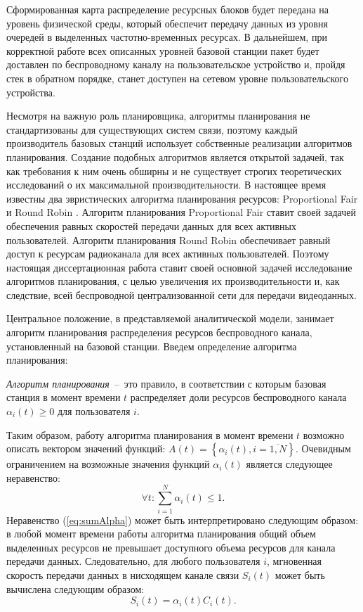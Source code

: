 Сформированная карта распределение ресурсных блоков будет передана на уровень физической среды, который обеспечит передачу данных из уровня очередей в выделенных частотно-временных ресурсах. В дальнейшем, при корректной работе всех описанных уровней базовой станции пакет будет доставлен по беспроводному каналу на пользовательское устройство и, пройдя стек в обратном порядке, станет доступен на сетевом уровне пользовательского устройства.

Несмотря на важную роль планировщика, алгоритмы планирования не стандартизованы для существующих систем связи, поэтому каждый производитель базовых станций использует собственные реализации алгоритмов планирования. Создание подобных алгоритмов является открытой задачей, так как требования к ним очень обширны и не существует строгих теоретических исследований о их максимальной производительности. В настоящее время известны два эвристических алгоритма планирования ресурсов: Proportional Fair \cite{1310314} и Round Robin \cite{miao_zander_sung_ben_slimane_2016}. Алгоритм планирования Proportional Fair ставит своей задачей обеспечения равных скоростей передачи данных для всех активных пользователей. Алгоритм планирования Round Robin обеспечивает равный доступ к ресурсам радиоканала для всех активных пользователей. Поэтому настоящая диссертационная работа ставит своей основной задачей исследование алгоритмов планирования, с целью увеличения их производительности и, как следствие, всей беспроводной централизованной сети для передачи видеоданных.

Центральное положение, в представляемой аналитической модели, занимает алгоритм планирования распределения ресурсов беспроводного канала, установленный на базовой станции. Введем определение алгоритма планирования:

\begin{definition}
\label{def:SchedulingAlg}
    \emph{Алгоритм планирования}~--~это правило, в соответствии с которым базовая станция в момент времени $t$ распределяет доли ресурсов беспроводного канала $\alpha_i(t) \geq 0$ для пользователя $i$.
\end{definition}

Таким образом, работу алгоритма планирования в момент времени $t$ возможно описать вектором значений функций: ${A}(t) = \left\{\alpha_{i}(t), i = \overline{1,N}\right\}$. Очевидным ограничением на возможные значения функций $\alpha_i(t)$ является следующее неравенство:
\begin{equation}
\forall t: \sum\limits_{i=1}^{N}\alpha_{i}(t) \leq 1.
\label{eq:sumAlpha}
\end{equation}
Неравенство (\ref{eq:sumAlpha}) может быть интерпретировано следующим образом: в любой момент времени работы алгоритма планирования общий объем выделенных ресурсов не превышает доступного объема ресурсов для канала передачи данных. Следовательно, для любого пользователя $i$, мгновенная скорость передачи данных в нисходящем канале связи $S_i(t)$ может быть вычислена следующим образом:
\begin{equation}
S_i(t) = \alpha_i(t) C_i(t).
\label{eq:MomentRate}
\end{equation}

